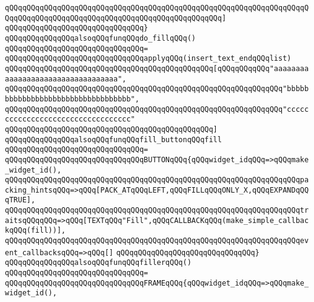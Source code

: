 \verb|qQQqqQQqqQQqqQQqqQQqqQQqqQQqqQQqqQQqqQQqqQQqqQQqqQQqqQQqqQQqqQQqqQQqqQQqqQQqqQQqqQQqqQQqqQQqqQQqqQQqqQQqqQQqqQQqqQQqqQQq]|\newline
\verb|qQQqqQQqqQQqqQQqqQQqqQQqqQQqqQQq}|\newline
\newline
\verb|qQQqqQQqqQQqqQQqalsoqQQqfunqQQqdo_fillqQQq()|\newline
\verb|qQQqqQQqqQQqqQQqqQQqqQQqqQQqqQQq=|\newline
\verb|qQQqqQQqqQQqqQQqqQQqqQQqqQQqqQQqapplyqQQq(insert_text_endqQQqlist)|\newline
\verb|qQQqqQQqqQQqqQQqqQQqqQQqqQQqqQQqqQQqqQQqqQQqqQQq[qQQqqQQqqQQq"aaaaaaaaaaaaaaaaaaaaaaaaaaaaaaaaaa",|\newline
\verb|qQQqqQQqqQQqqQQqqQQqqQQqqQQqqQQqqQQqqQQqqQQqqQQqqQQqqQQqqQQqqQQq"bbbbbbbbbbbbbbbbbbbbbbbbbbbbbbbbbb",|\newline
\verb|qQQqqQQqqQQqqQQqqQQqqQQqqQQqqQQqqQQqqQQqqQQqqQQqqQQqqQQqqQQqqQQq"cccccccccccccccccccccccccccccccccc"|\newline
\verb|qQQqqQQqqQQqqQQqqQQqqQQqqQQqqQQqqQQqqQQqqQQqqQQq]|\newline
\newline
\verb|qQQqqQQqqQQqqQQqalsoqQQqfunqQQqfill_buttonqQQqfill|\newline
\verb|qQQqqQQqqQQqqQQqqQQqqQQqqQQqqQQq=|\newline
\verb|qQQqqQQqqQQqqQQqqQQqqQQqqQQqqQQqBUTTONqQQq{qQQqwidget_idqQQq=>qQQqmake_widget_id(),|\newline
\verb|qQQqqQQqqQQqqQQqqQQqqQQqqQQqqQQqqQQqqQQqqQQqqQQqqQQqqQQqqQQqqQQqqQQqpacking_hintsqQQq=>qQQq[PACK_ATqQQqLEFT,qQQqFILLqQQqONLY_X,qQQqEXPANDqQQqTRUE],|\newline
\verb|qQQqqQQqqQQqqQQqqQQqqQQqqQQqqQQqqQQqqQQqqQQqqQQqqQQqqQQqqQQqqQQqqQQqtraitsqQQqqQQq=>qQQq[TEXTqQQq"Fill",qQQqCALLBACKqQQq(make_simple_callbackqQQq(fill))],|\newline
\verb|qQQqqQQqqQQqqQQqqQQqqQQqqQQqqQQqqQQqqQQqqQQqqQQqqQQqqQQqqQQqqQQqqQQqevent_callbacksqQQq=>qQQq[]|\newline
\verb|qQQqqQQqqQQqqQQqqQQqqQQqqQQqqQQq}|\newline
\newline
\verb|qQQqqQQqqQQqqQQqalsoqQQqfunqQQqfillerqQQq()|\newline
\verb|qQQqqQQqqQQqqQQqqQQqqQQqqQQqqQQq=|\newline
\verb|qQQqqQQqqQQqqQQqqQQqqQQqqQQqqQQqFRAMEqQQq{qQQqwidget_idqQQq=>qQQqmake_widget_id(),|\newline
